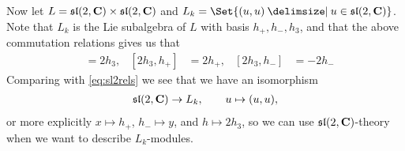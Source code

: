 Now let $L=\mathfrak{sl}(2,\mathbf{C})\times \mathfrak{sl}(2,\mathbf{C})$ and $L_k=\Set{(u,u)\given u\in\slc}$. Note that $L_k$ is the Lie subalgebra of $L$ with basis $h_+,h_-,h_3$, and that the above commutation relations gives us that 
\begin{align*}
  [h_+,h_-] &= 2h_3, & [2h_3,h_+] &= 2h_+, & [2h_3,h_-] &= -2h_-
\end{align*}
Comparing with \cref{eq:sl2rels} we see that we have an isomorphism
\begin{align}
  \mathfrak{sl}(2,\mathbf{C})\to L_k,\qquad u\mapsto (u,u), \label{eq:sl2iso}
\end{align}
or more explicitly $x\mapsto h_+$, $h_-\mapsto y$, and $h\mapsto 2h_3$, so we can use $\mathfrak{sl}(2,\mathbf{C})$-theory when we want to describe $L_k$-modules.

